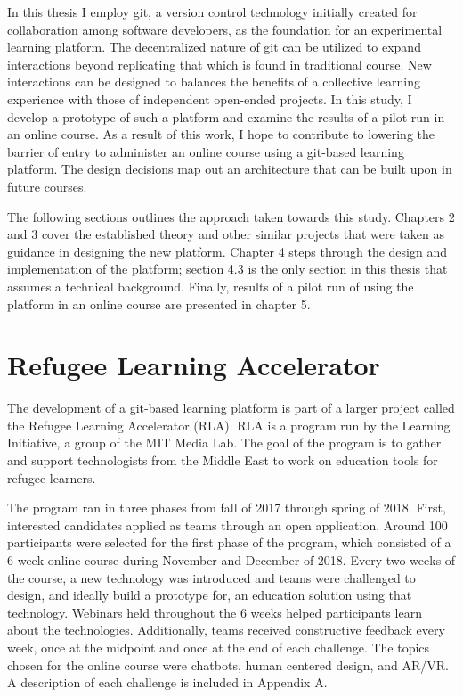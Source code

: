 \documentclass[12pt,twoside,vi]{mitthesis}
\begin{document}
In this thesis I employ git, a version control technology initially created for collaboration among software developers, as the foundation for an experimental learning platform. The decentralized nature of git can be utilized to expand interactions beyond replicating that which is found in traditional course. New interactions can be designed to balances the benefits of a collective learning experience with those of independent open-ended projects. In this study, I develop a prototype of such a platform and examine the results of a pilot run in an online course. As a result of this work, I hope to contribute to lowering the barrier of entry to administer an online course using a git-based learning platform. The design decisions map out an architecture that can be built upon in future courses. 

The following sections outlines the approach taken towards this study. Chapters 2 and 3 cover the established theory and other similar projects that were taken as guidance in designing the new platform. Chapter 4 steps through the design and implementation of the platform; section 4.3 is the only section in this thesis that assumes a technical background. Finally, results of a pilot run of using the platform in an online course are presented in chapter 5. 

\section{Refugee Learning Accelerator}

The development of a git-based learning platform is part of a larger project called the Refugee Learning Accelerator (RLA). RLA is a program run by the Learning Initiative, a group of the MIT Media Lab. The goal of the program is to gather and support technologists from the Middle East to work on education tools for refugee learners. 

The program ran in three phases from fall of 2017 through spring of 2018. First, interested candidates applied as teams through an open application. Around 100 participants were selected for the first phase of the program, which consisted of a 6-week online course during November and December of 2018. Every two weeks of the course, a new technology was introduced and teams were challenged to design, and ideally build a prototype for, an education solution using that technology. Webinars held throughout the 6 weeks helped participants learn about the technologies. Additionally, teams received constructive feedback every week, once at the midpoint and once at the end of each challenge. The topics chosen for the online course were chatbots, human centered design, and AR/VR. A description of each challenge is included in Appendix A.
\end{document}
